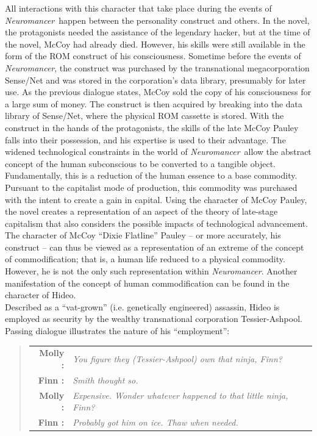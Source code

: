 \documentclass[11pt]{article}
\newcommand\neuro{\textit{Neuromancer}}
\begin{document}
	All interactions with this character that take place during the events of \neuro\ happen between the personality construct and others. In the novel, the protagonists needed the assistance of the legendary hacker, but at the time of the novel, McCoy had already died. However, his skills were still available in the form of the ROM construct of his consciousness. Sometime before the events of \neuro, the construct was purchased by the transnational megacorporation Sense/Net and was stored in the corporation’s data library, presumably for later use. As the previous dialogue states, McCoy sold the copy of his consciousness for a large sum of money. The construct is then acquired by breaking into the data library of Sense/Net, where the physical ROM cassette is stored. With the construct in the hands of the protagonists, the skills of the late McCoy Pauley falls into their possession, and his expertise is used to their advantage. The widened technological constraints in the world of \neuro\ allow the abstract concept of the human subconscious to be converted to a tangible object. Fundamentally, this is a reduction of the human essence to a base commodity. Pursuant to the capitalist mode of production, this commodity was purchased with the intent to create a gain in capital. Using the character of McCoy Pauley, the novel creates a representation of an aspect of the theory of late-stage capitalism that also considers the possible impacts of technological advancement.\\
	\smallbreak\noindent
	The character of McCoy ``Dixie Flatline'' Pauley – or more accurately, his construct – can thus be viewed as a representation of an extreme of the concept of commodification; that is, a human life reduced to a physical commodity. However, he is not the only such representation within \neuro. Another manifestation of the concept of human commodification can be found in the character of Hideo.\\
	\smallbreak\noindent
	Described as a ``vat-grown'' (i.e. genetically engineered) assassin, Hideo is employed as security by the wealthy transnational corporation Tessier-Ashpool. Passing dialogue illustrates the nature of his ``employment'':
	\begin{quote}
		\begin{tabular}{>{\bf}r<{:}>{\it}p{10cm}}
			Molly & You figure they \emph{(Tessier-Ashpool)} own that ninja, Finn?\\
			Finn & Smith thought so.\\
			Molly & Expensive. Wonder whatever happened to that little ninja, Finn?\\
			Finn & Probably got him on ice. Thaw when needed.\\
		\end{tabular}
		\flushright{--\neuro: p. 86}
	\end{quote}
\end{document}
